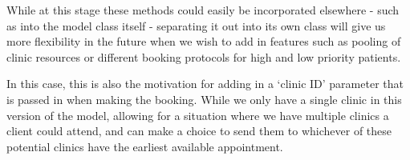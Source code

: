 \documentclass[
  letterpaper,
  DIV=11,
  numbers=noendperiod]{scrreprt}
\begin{document}
\begin{tcolorbox}[enhanced jigsaw, rightrule=.15mm, colback=white, colframe=quarto-callout-tip-color-frame, colbacktitle=quarto-callout-tip-color!10!white, toprule=.15mm, coltitle=black, opacityback=0, titlerule=0mm, bottomtitle=1mm, breakable, title=\textcolor{quarto-callout-tip-color}{\faLightbulb}\hspace{0.5em}{Tip}, opacitybacktitle=0.6, toptitle=1mm, arc=.35mm, bottomrule=.15mm, leftrule=.75mm, left=2mm]

While at this stage these methods could easily be incorporated elsewhere
- such as into the model class itself - separating it out into its own
class will give us more flexibility in the future when we wish to add in
features such as pooling of clinic resources or different booking
protocols for high and low priority patients.

In this case, this is also the motivation for adding in a `clinic ID'
parameter that is passed in when making the booking. While we only have
a single clinic in this version of the model, allowing for a situation
where we have multiple clinics a client could attend, and can make a
choice to send them to whichever of these potential clinics have the
earliest available appointment.

\end{tcolorbox}
\end{document}
